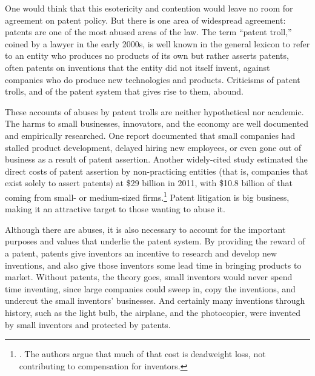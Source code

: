 \documentclass[11pt,twocolumn,titlepage]{article}
\begin{document}
One would think that this esotericity and contention would leave no room for agreement on patent policy. But there is one area of widespread agreement:
patents are one of the most abused areas of the law.
The term ``patent troll,'' coined by a lawyer
in the early 2000s, is
well known in the general lexicon to refer to an entity who produces no products
of its own but rather asserts patents, often patents on inventions that the
entity did not itself invent, against companies who do produce new technologies
and products. Criticisms of patent trolls, and of the patent system that gives
rise to them, abound.

These accounts of abuses by patent trolls are neither hypothetical nor
academic. The harms to small businesses, innovators, and the economy are well
documented and empirically researched. One report documented that small
companies had stalled product development, delayed hiring new employees, or even
gone out of business as a result of patent assertion. Another widely-cited study estimated the direct costs of patent
assertion by non-practicing entities (that is, companies that exist solely to
assert patents)
at \$29 billion in 2011, with \$10.8 billion of that coming from
small- or medium-sized firms.\footnote{.
The authors argue that much of that cost is deadweight loss, not contributing to
compensation for inventors.} Patent
litigation is big business, making it an attractive target to those wanting to
abuse it.

Although there are abuses, it is also necessary to account for the important
purposes and values
that underlie the patent system. By providing the reward of a patent,
patents give inventors
an incentive to research and develop new inventions, and also give those
inventors some lead time in bringing products to
market. Without patents, the theory goes, small inventors would never spend time
inventing, since large companies could sweep in, copy the inventions, and
undercut the small inventors' businesses. And certainly many inventions through
history, such as the light bulb, the airplane, and the photocopier, were
invented by small inventors and protected by patents.
\end{document}
